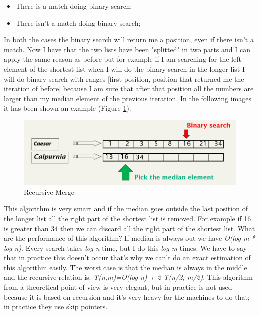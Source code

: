\begin{itemize}
    \item There is a match doing binary search;
    \item There isn't a match doing binary search;
\end{itemize}
In both the cases the binary search will return me a position, even if there isn't a match. Now I have that the two lists have been "splitted" in two parts and I can apply the same reason as before but for example if I am searching for the left element of the shortest list when I will do the binary search in the longer list I will do binary search with ranges [first position, position that returned me the iteration of before] because I am sure that after that position all the numbers are larger than my median element of the previous iteration.
In the following images it has been shown an example (Figure \ref{fig:recursivemerge}).
\begin{figure}
    \centering
    \includegraphics[width=0.75\linewidth]{images/recursivemerge.png}
    \caption{Recursive Merge}
    \label{fig:recursivemerge}
\end{figure}
This algorithm is very smart and if the median goes outside the last position of the longer list all the right part of the shortest list is removed. For example if 16 is greater than 34 then we can discard all the right part of the shortest list.\newline
What are the performance of this algorithm? If median is always out we have \textit{O(log m * log n)}. Every search takes \textit{log n} time, but I do this \textit{log m} times. We have to say that in practice this doesn't occur that's why we can't do an exact estimation of this algorithm easily.\newline
The worst case is that the median is always in the middle and the recursive relation is: \textit{T(n,m)=O(log n) + 2 T(n/2, m/2)}. This algorithm from a theoretical point of view is very elegant, but in practice is not used because it is based on recursion and it's very heavy for the machines to do that; in practice they use skip pointers.
